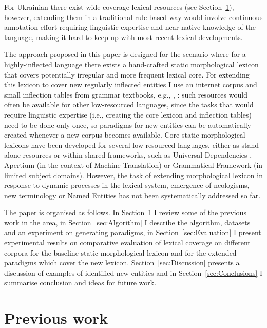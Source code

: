 \documentclass[11pt,a4paper]{article}
\begin{document}
For Ukrainian there exist wide-coverage lexical resources (see Section~\ref{sec:PrevWork}), however, extending them in a traditional rule-based way would involve continuous annotation effort requiring linguistic expertise and near-native knowledge of the language, making it hard to keep up with most recent lexical developments. 

The approach proposed in this paper is designed for the scenario where for a highly-inflected language there exists a hand-crafted static morphological lexicon that covers potentially irregular and more frequent lexical core. For extending this lexicon to cover new regularly inflected entities I use an internet corpus and small inflection tables from grammar textbooks, e.g., \cite{hryshchenko1997sulm}, \cite{press2015ukrainian}: such resources would often be available for other low-resourced languages, since the tasks that would require linguistic expertise (i.e., creating the core lexicon and inflection tables) need to be done only once, so paradigms for new entities can be automatically created whenever a new corpus becomes available. Core static morphological lexicons have been developed for several low-resourced languages, either as stand-alone resources or within shared frameworks, such as Universal Dependencies \cite{nivre2016universal}, Apertium \cite{forcada2011apertium} (in the context of Machine Translation) or Grammatical Framework \cite{ranta11gram} (in limited subject domains). However, the task of extending morphological lexicon in response to dynamic processes in the lexical system, emergence of neologisms, new terminology or Named Entities has not been systematically addressed so far.

The paper is organised as follows. In Section~\ref{sec:PrevWork} I review some of the previous work in the area, in Section~\ref{sec:Algorithm} I describe the algorithm, datasets and an experiment on generating paradigms, in Section~\ref{sec:Evaluation} I present experimental results on comparative evaluation of lexical coverage on different corpora for the baseline static morphological lexicon and for the extended paradigms which cover the new lexicon. Section~\ref{sec:Discussion} presents a discussion of examples of identified new entities and in Section~\ref{sec:Conclusions} I summarise conclusion and ideas for future work.

\section{Previous work}
\label{sec:PrevWork}
\end{document}
